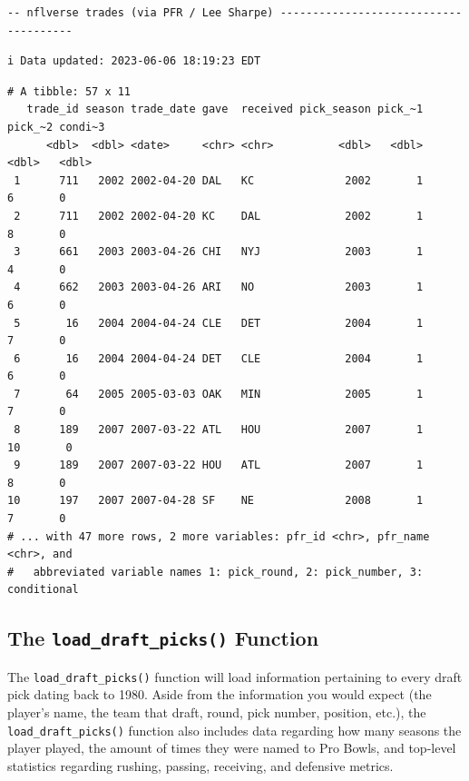 \documentclass[
  letterpaper,
]{krantz}
\begin{document}
\begin{verbatim}
-- nflverse trades (via PFR / Lee Sharpe) --------------------------------------
\end{verbatim}

\begin{verbatim}
i Data updated: 2023-06-06 18:19:23 EDT
\end{verbatim}

\begin{verbatim}
# A tibble: 57 x 11
   trade_id season trade_date gave  received pick_season pick_~1 pick_~2 condi~3
      <dbl>  <dbl> <date>     <chr> <chr>          <dbl>   <dbl>   <dbl>   <dbl>
 1      711   2002 2002-04-20 DAL   KC              2002       1       6       0
 2      711   2002 2002-04-20 KC    DAL             2002       1       8       0
 3      661   2003 2003-04-26 CHI   NYJ             2003       1       4       0
 4      662   2003 2003-04-26 ARI   NO              2003       1       6       0
 5       16   2004 2004-04-24 CLE   DET             2004       1       7       0
 6       16   2004 2004-04-24 DET   CLE             2004       1       6       0
 7       64   2005 2005-03-03 OAK   MIN             2005       1       7       0
 8      189   2007 2007-03-22 ATL   HOU             2007       1      10       0
 9      189   2007 2007-03-22 HOU   ATL             2007       1       8       0
10      197   2007 2007-04-28 SF    NE              2008       1       7       0
# ... with 47 more rows, 2 more variables: pfr_id <chr>, pfr_name <chr>, and
#   abbreviated variable names 1: pick_round, 2: pick_number, 3: conditional
\end{verbatim}

\hypertarget{the-load_draft_picks-function}{%
\subsection{\texorpdfstring{The \texttt{load\_draft\_picks()}
Function}{The load\_draft\_picks() Function}}\label{the-load_draft_picks-function}}

The \texttt{load\_draft\_picks()} function will load information
pertaining to every draft pick dating back to 1980. Aside from the
information you would expect (the player's name, the team that draft,
round, pick number, position, etc.), the \texttt{load\_draft\_picks()}
function also includes data regarding how many seasons the player
played, the amount of times they were named to Pro Bowls, and top-level
statistics regarding rushing, passing, receiving, and defensive metrics.
\end{document}

